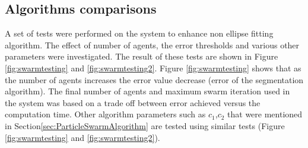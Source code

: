 \documentclass{article}
\begin{document}
\begin{table}
\begin{center}
\caption[Datasets Comparisons]{Datasets Comparisons} 
\label{tab:datasets}

\end{center}
\end{table}

 


\subsection{Algorithms comparisons}
\label{sec:AlgExp}
A set of tests were performed on the system to enhance non ellipse fitting algorithm. The effect of number of agents, the error thresholds and various other parameters were investigated. The result of these tests are shown in Figure \ref{fig:swarmtesting} and   \ref{fig:swarmtesting2}. Figure \ref{fig:swarmtesting} shows that as the number of agents increases the error value decrease (error of the segmentation algorithm). The final number of agents and maximum swarm iteration used in the system was based on a trade off between error achieved versus the computation time. Other algorithm parameters such as $c_1$,$c_2$ that were mentioned in Section\ref{sec:ParticleSwarmAlgorithm} are tested using similar tests (Figure \ref{fig:swarmtesting} and \ref{fig:swarmtesting2}).
    
\end{document}
